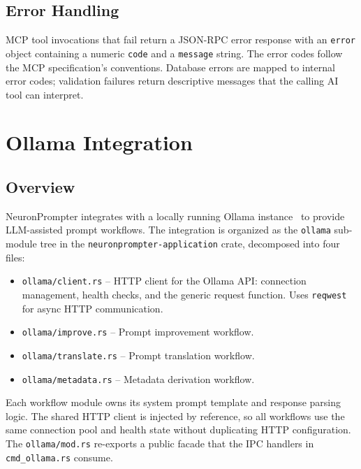 \documentclass[a4paper, 11pt, oneside]{report}
\begin{document}
\section{Error Handling}
\label{sec:mcp-errors}

MCP tool invocations that fail return a JSON-RPC error response with an
\texttt{error} object containing a numeric \texttt{code} and a
\texttt{message} string.  The error codes follow the MCP specification's
conventions.  Database errors are mapped to internal error codes;
validation failures return descriptive messages that the calling AI tool
can interpret.


\chapter{Ollama Integration}
\label{ch:ollama}

\section{Overview}
\label{sec:ollama-overview}

NeuronPrompter integrates with a locally running Ollama
instance~\cite{ollama} to provide LLM-assisted prompt workflows.  The
integration is organized as the \texttt{ollama} sub-module tree in the
\texttt{neuronprompter-application} crate, decomposed into four files:

\begin{itemize}
  \item \texttt{ollama/client.rs} -- HTTP client for the Ollama API:
        connection management, health checks, and the generic request
        function.  Uses \texttt{reqwest}~\cite{reqwest} for async HTTP
        communication.
  \item \texttt{ollama/improve.rs} -- Prompt improvement workflow.
  \item \texttt{ollama/translate.rs} -- Prompt translation workflow.
  \item \texttt{ollama/metadata.rs} -- Metadata derivation workflow.
\end{itemize}

Each workflow module owns its system prompt template and response
parsing logic.  The shared HTTP client is injected by reference,
so all workflows use the same connection pool and health state without
duplicating HTTP configuration.  The \texttt{ollama/mod.rs} re-exports
a public facade that the IPC handlers in \texttt{cmd\_ollama.rs}
consume.
\end{document}
